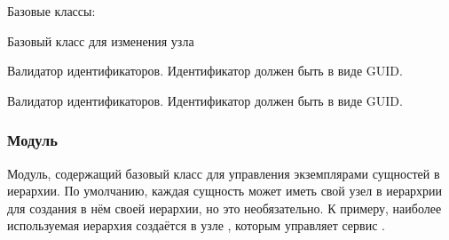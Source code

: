 \documentclass[a4paper,10pt,russian]{sphinxmanual}
\begin{document}
\begin{fulllineitems}

\pysigstartsignatures
{}
\pysigstopsignatures
\sphinxAtStartPar
Базовые классы: 

\sphinxAtStartPar
Базовый класс для изменения узла


\begin{fulllineitems}

\pysigstartsignatures
{}
\pysigstopsignatures
\sphinxAtStartPar
Валидатор идентификаторов.
Идентификатор должен быть в виде GUID.

\end{fulllineitems}


\end{fulllineitems}



\begin{fulllineitems}

\pysigstartsignatures
{}
\pysigstopsignatures
\sphinxAtStartPar
Валидатор идентификаторов.
Идентификатор должен быть в виде GUID.

\end{fulllineitems}



\subsubsection{Модуль }
\label{\detokenize{developer:model-crud-svc}}
\sphinxAtStartPar
Модуль, содержащий базовый класс для управления экземплярами сущностей
в иерархии. По умолчанию, каждая сущность может иметь свой узел в иерархрии
для создания в нём своей иерархии, но это необязательно.
К примеру, наиболее используемая иерархия создаётся в узле ,
которым управляет сервис .
\end{document}

